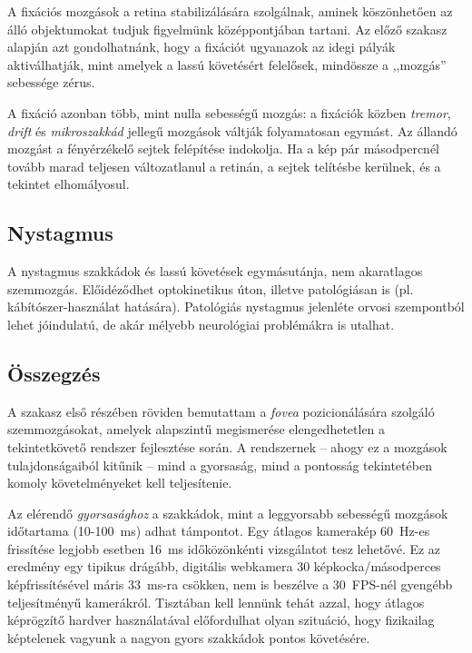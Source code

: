 A fixációs mozgások a retina stabilizálására szolgálnak, aminek köszönhetően az álló objektumokat tudjuk figyelmünk középpontjában tartani. Az előző szakasz alapján azt gondolhatnánk, hogy a fixációt ugyanazok az idegi pályák aktiválhatják, mint amelyek a lassú követésért felelősek, mindössze a ,,mozgás'' sebessége zérus.

A fixáció azonban több, mint nulla sebességű mozgás: a fixációk közben \emph{tremor}, \emph{drift} és \emph{mikroszakkád} jellegű mozgások váltják folyamatosan egymást. Az állandó mozgást a fényérzékelő sejtek felépítése indokolja. Ha a kép pár másodpercnél tovább marad teljesen változatlanul a retinán, a sejtek telítésbe kerülnek, és a tekintet elhomályosul.

\subsection{Nystagmus}\label{sect:nystagmus}

A nystagmus szakkádok és lassú követések egymásutánja, nem akaratlagos szemmozgás. Előidéződhet optokinetikus úton, illetve patológiásan is (pl. kábítószer-használat hatására). Patológiás nystagmus jelenléte orvosi szempontból lehet jóindulatú, de akár mélyebb neurológiai problémákra is utalhat.

\subsection{Összegzés}\label{sect:mozg_osszegzes}

A szakasz első részében röviden bemutattam a \emph{fovea} pozicionálására szolgáló szemmozgásokat, amelyek alapszintű megismerése elengedhetetlen a tekintetkövető rendszer fejlesztése során. A rendszernek -- ahogy ez a mozgások tulajdonságaiból kitűnik -- mind a gyorsaság, mind a pontosság tekintetében komoly követelményeket kell teljesítenie.

Az elérendő \textit{gyorsasághoz} a szakkádok, mint a leggyorsabb sebességű mozgások időtartama (10-100~ms) adhat támpontot. Egy átlagos kamerakép 60~Hz-es frissítése legjobb esetben 16~ms időközönkénti vizsgálatot tesz lehetővé. Ez az eredmény egy tipikus drágább, digitális webkamera 30 képkocka/másodperces képfrissítésével máris 33~ms-ra csökken, nem is beszélve a 30~FPS-nél gyengébb teljesítményű kamerákról. Tisztában kell lennünk tehát azzal, hogy átlagos képrögzítő hardver használatával előfordulhat olyan szituáció, hogy fizikailag képtelenek vagyunk a nagyon gyors szakkádok pontos követésére.

